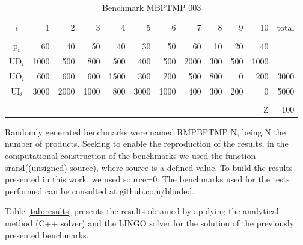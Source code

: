 \documentclass[authoryear,preprint,12pt]{elsarticle}
\begin{document}
\begin{table}[h]
\begin{center}
\begin{small}
\begin{tabular}[c]{c r r r r r r r r r r r }
$i$ & 1 & 2 & 3 & 4 & 5 & 6 & 7 & 8 & 9 & 10 & total \\
\cline {1-12} \\
$\textrm{p}_i$ & 60 & 40 & 50 & 40 & 30 & 50 & 60 & 10 & 20 & 40\\
$\textrm{UD}_i$ & 1000 & 500 & 800 & 500 & 400 & 500 & 2000 & 300 & 500 & 1000 \\
$\textrm{UO}_i$ & 600 & 600 & 600 & 1500 & 300 & 200 & 500 & 800 & 0 & 200 & 3000 \\
$\textrm{UI}_i$ & 3000 & 2000 & 1000 & 800 & 3000 & 1000 & 400 & 300 & 200 & 0 & 5000 \\
\cline {1-12} \\
& & & & & & & & & & $\textrm{Z}$ & 100 \\
\end{tabular}
\caption{Benchmark MBPTMP 003}
\label{tab:MBPTMP003}
\end{small}
\end{center}
\end{table}

Randomly generated benchmarks were named RMPBPTMP $\textrm{N}$, being $\textrm{N}$ the number of products. Seeking to enable the reproduction of the results, in the computational construction of the benchmarks we used the function srand((unsigned) source), where source is a defined value. To build the results presented in this work, we used source=0. The benchmarks used for the tests performed can be consulted at github.com/blinded.

Table \ref{tab:results} presents the results obtained by applying the analytical method (C++ solver) and the LINGO solver for the solution of the previously presented benchmarks.
\end{document}
